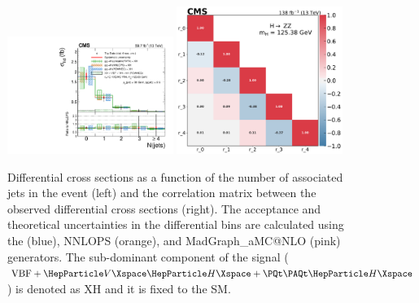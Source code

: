 \begin{center}
	\begin{figure}[!htb]
		\centering
		\includegraphics[width=0.48\textwidth]{Images/H4L/njets_pt30_eta2p5_unfoldwith_SM_125_asimov.pdf}
		\includegraphics[width=0.48\textwidth]{Images/H4L/correlations/corr_njets_pt30_eta4p7_v3.pdf}\\
		\caption{
			Differential cross sections as a function of the number of associated jets in the event (left) and the correlation matrix between the observed differential cross sections (right).
			The acceptance and theoretical uncertainties in the differential bins are calculated using the \POWHEG (blue), NNLOPS (orange), and MadGraph\_aMC@NLO (pink) generators.
			The sub-dominant component of the signal ($\VBF + \VH + \ttH$) is denoted as XH and it is fixed to the SM.
			\label{fig:fidNJ}}
	\end{figure}
\end{center}

\clearpage

